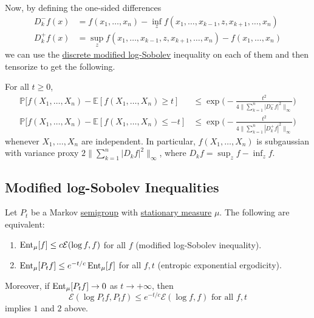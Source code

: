   Now, by defining the one-sided differences 
  \begin{align*}
      D_k^- f (x) & = f(x_1, \ldots, x_n) - \inf_z f (x_1, \ldots, x_{k-1}, z, x_{k+1}, \ldots, x_n) \\
      D_k^+ f (x) & = \sup_z f (x_1, \ldots, x_{k-1}, z, x_{k+1}, \ldots, x_n) - f(x_1, \ldots, x_n) 
  \end{align*}
  we can use the \hyperref[thm:discrete-modified-log-sobolev]{discrete modified log-Sobolev} inequality on each of them and then tensorize to get the following. 

  \begin{theorem}
    \label{thm:bounded-difference-inequality}
  For all $t \geq 0$, 
  \begin{align*}
      \mathbb{P}[ f(X_1, \ldots, X_n) - \mathbb{E}[f(X_1, \ldots, X_n) \geq t] & \leq \exp \bigg( -\frac{t^2}{4 \| \sum_{k=1}^n |D_k^- f|^2\|_\infty} \bigg) \\
      \mathbb{P}[ f(X_1, \ldots, X_n) - \mathbb{E}[f(X_1, \ldots, X_n) \leq -t] & \leq \exp \bigg( -\frac{t^2}{4 \| \sum_{k=1}^n |D_k^+ f|^2\|_\infty} \bigg) 
  \end{align*}
  whenever $X_1, \ldots, X_n$ are independent. In particular, $f(X_1, \ldots, X_n)$ is subgaussian with variance proxy $2 \|\sum_{k=1}^n |D_k f|^2 \|_\infty$, where $D_k f = \sup_z f - \inf_z f$. 
  \end{theorem}

\subsection{Modified log-Sobolev Inequalities}

  \begin{theorem}
    \label{thm:modified-log-sobolov-inequality}
  Let $P_t$ be a Markov \hyperref[alg-def:semigroup]{semigroup} with \hyperref[def:stationary-measure]{stationary measure} $\mu$. The following are equivalent: 
  \begin{enumerate}
      \item $\operatorname{Ent}_\mu [f] \leq c \mathcal{E}(\log f, f)$ for all $f$ (modified log-Sobolev inequality). 
      \item $\operatorname{Ent}_\mu [P_t f] \leq e^{-t/c} \operatorname{Ent}_\mu [f]$ for all $f, t$ (entropic exponential ergodicity). 
  \end{enumerate}
  Moreover, if $\operatorname{Ent}_\mu [P_t f] \rightarrow 0$ as $t \rightarrow +\infty$, then 
  \begin{equation}
    \mathcal{E}(\log P_t f, P_t f) \leq e^{-t/c} \mathcal{E}(\log f, f) \text{ for all } f, t
  \end{equation}
  implies $1$ and $2$ above. 
  \end{theorem}

